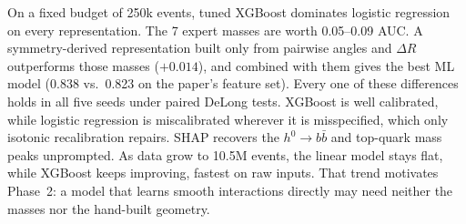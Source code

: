 On a fixed budget of 250k events, tuned XGBoost dominates logistic regression on every
representation. The 7 expert masses are worth 0.05--0.09 AUC. A symmetry-derived representation
built only from pairwise angles and $\Delta R$ outperforms those masses ($+0.014$), and combined
with them gives the best ML model (0.838 vs.\ 0.823 on the paper's feature set). Every one of these
differences holds in all five seeds under paired DeLong tests. XGBoost is well calibrated, while
logistic regression is miscalibrated wherever it is misspecified, which only isotonic recalibration
repairs. SHAP recovers the $h^0\!\to b\bar b$ and top-quark mass peaks unprompted. As data grow
to 10.5M events, the linear model stays flat, while XGBoost keeps improving, fastest on raw inputs.
That trend motivates Phase~2: a model that learns smooth interactions directly may need neither the
masses nor the hand-built geometry.
